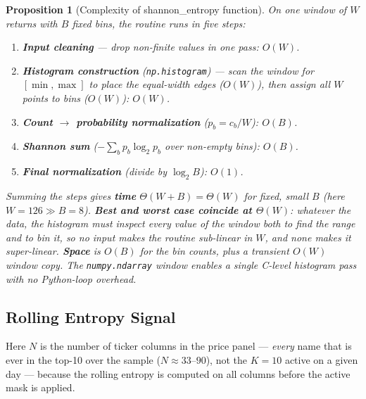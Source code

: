\documentclass[a4paper,12pt]{article}
\newtheorem{proposition}{Proposition}[section]
\begin{document}
\begin{proposition}[Complexity of shannon\_entropy function]
On one window of $W$ returns with $B$ fixed bins, the routine runs in five steps:
\begin{enumerate}[label=(\roman*)]
    \item \textbf{Input cleaning} --- drop non-finite values in one pass: $O(W)$.
    \item \textbf{Histogram construction} (\texttt{np.histogram}) --- scan the window for $[\min,\max]$ to place the equal-width edges ($O(W)$), then assign all $W$ points to bins ($O(W)$): $O(W)$.
    \item \textbf{Count $\to$ probability normalization} ($p_b=c_b/W$): $O(B)$.
    \item \textbf{Shannon sum} ($-\sum_b p_b\log_2 p_b$ over non-empty bins): $O(B)$.
    \item \textbf{Final normalization} (divide by $\log_2 B$): $O(1)$.
\end{enumerate}
Summing the steps gives \textbf{time} $\Theta(W+B)=\Theta(W)$ for fixed, small $B$ (here $W=126\gg B=8$). \textbf{Best and worst case coincide at $\Theta(W)$}: whatever the data, the histogram must inspect every value of the window both to find the range and to bin it, so no input makes the routine sub-linear in $W$, and none makes it super-linear. \textbf{Space} is $O(B)$ for the bin counts, plus a transient $O(W)$ window copy. The \texttt{numpy.ndarray} window enables a single C-level histogram pass with no Python-loop overhead.
\end{proposition}

\subsection{Rolling Entropy Signal}

Here $N$ is the number of ticker columns in the price panel --- \emph{every} name that is ever in the top-10 over the sample ($N\approx 33$--$90$), not the $K=10$ active on a given day --- because the rolling entropy is computed on all columns before the active mask is applied.
\end{document}
